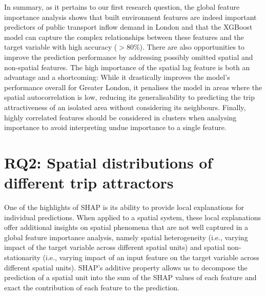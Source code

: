 In summary, as it pertains to our first research question, the global feature importance analysis shows that built environment features are indeed important predictors of public transport inflow demand in London and that the XGBoost model can capture the complex relationships between these features and the target variable with high accuracy ($>80\%$). There are also opportunities to improve the prediction performance by addressing possibly omitted spatial and non-spatial features. The high importance of the spatial lag feature is both an advantage and a shortcoming: While it drastically improves the model's performance overall for Greater London, it penalises the model in areas where the spatial autocorrelation is low, reducing its generalisability to predicting the trip attractiveness of an isolated area without considering its neighbours. Finally, highly correlated features should be considered in clusters when analysing importance to avoid interpreting undue importance to a single feature.

\pagebreak[4]
\section{RQ2: Spatial distributions of different trip attractors}

One of the highlights of SHAP is its ability to provide local explanations for individual predictions. When applied to a spatial system, these local explanations offer additional insights on spatial phenomena that are not well captured in a global feature importance analysis, namely spatial heterogeneity (i.e., varying impact of the target variable across different spatial units) and spatial non-stationarity (i.e., varying impact of an input feature on the target variable across different spatial units). SHAP's additive property allows us to decompose the prediction of a spatial unit into the sum of the SHAP values of each feature and exact the contribution of each feature to the prediction.

